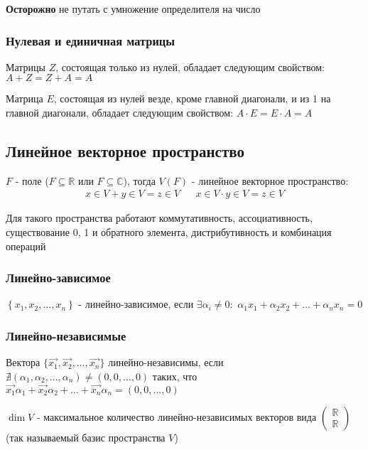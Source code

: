 \documentclass[class=article,a4paper,12pt,crop=false]{standalone}
\begin{document}
\textbf{Осторожно} не путать с умножение определителя на число

\subsubsection{Нулевая и единичная матрицы}

Матрицы $Z$, состоящая только из нулей, обладает следующим свойством: $A + Z = Z + A = A$

Матрица $E$, состоящая из нулей везде, кроме главной диагонали, и из 1 на главной диагонали,
обладает следующим свойством: $A\cdot E = E\cdot A = A$

\subsection{Линейное векторное пространство}

$F$ - поле ($F \subseteq \mathbb{R}$ или $F \subseteq \mathbb{C}$), тогда $V(F)$ -
линейное векторное пространство:
\begin{equation}
    \begin{aligned}
        x\in V + y \in V = z \in V & & x \in V \cdot y \in V = z\in V
    \end{aligned}
\end{equation}

Для такого пространства работают коммутативность, ассоциативность,
существование 0, 1 и обратного элемента, дистрибутивность и комбинация операций

\subsubsection{Линейно-зависимое}

$\left\{x_1, x_2, \dots, x_n\right\}$ - линейно-зависимое, если $\exists \alpha_i \neq 0:$
$\alpha_1x_1 + \alpha_2x_2 + \dots + \alpha_nx_n = 0$

\subsubsection{Линейно-независимые}

Вектора $\{\vec{x_1}, \vec{x_2}, \dots, \vec{x_n}\}$ линейно-независимы, если
$\nexists (\alpha_1, \alpha_2, \dots, \alpha_n) \neq (0, 0, \dots, 0)$ таких, что
$\vec{x_1}\alpha_1 + \vec{x_2}\alpha_2 + \dots + \vec{x_n}\alpha_n = (0, 0, \dots, 0)$

$\dim{V}$ - максимальное количество линейно-независимых векторов вида $\left(\begin{aligned}
    \mathbb{R} \\ \mathbb{R}
\end{aligned}\right)$ (так называемый базис пространства $V$)
\end{document}
